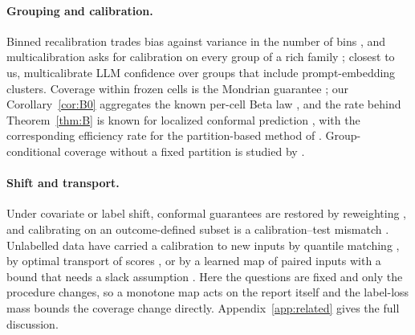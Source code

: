 \documentclass[11pt]{article}
\theoremstyle{definition}
\theoremstyle{remark}
\newcommand{\1}{\mathbf{1}}
\begin{document}
\paragraph{Grouping and calibration.} Binned recalibration trades bias against variance in the number of bins
\citep{kumar2019verified,gupta2021distribution,sun2023minimum}, and multicalibration asks for calibration on every
group of a rich family \citep{hebertjohnson2018multicalibration,kim2019multiaccuracy}; closest to us,
\citet{detommaso2024multicalibration} multicalibrate LLM confidence over groups that include prompt-embedding
clusters. Coverage within frozen cells is the Mondrian guarantee \citep{vovk2005algorithmic,vovk2012conditional};
our Corollary~\ref{cor:B0} aggregates the known per-cell Beta law \citep{ding2023class}, and the rate behind
Theorem~\ref{thm:B} is known for localized conformal prediction \citep{conrad2026beyond,min2026unified}, with the
corresponding efficiency rate for the partition-based method of \citet{lei2014distribution}. Group-conditional
coverage without a fixed partition is studied by \citet{gibbs2023conformal}.

\paragraph{Shift and transport.} Under covariate or label shift, conformal guarantees are restored by reweighting
\citep{tibshirani2019conformal,podkopaev2021distribution}, and calibrating on an outcome-defined subset is a
calibration--test mismatch \citep{wang2026trimming}. Unlabelled data have carried a calibration to new inputs by
quantile matching \citep{yilmaz2022testtime}, by optimal transport of scores \citep{correia2025nonexchangeable}, or
by a learned map of paired inputs with a bound that needs a slack assumption \citep{doula2026conformal}. Here the
questions are fixed and only the procedure changes, so a monotone map acts on the report itself and the label-loss
mass bounds the coverage change directly. Appendix~\ref{app:related} gives the full discussion.

\end{document}
